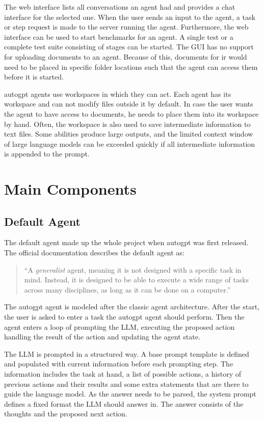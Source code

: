 \documentclass[../main.tex]{subfiles}
\begin{document}
The web interface lists all conversations an agent had and provides a chat interface for the selected one.
When the user sends an input to the agent, a task or step request is made to the server running the agent.
Furthermore, the web interface can be used to start benchmarks for an agent.
A single test or a complete test suite consisting of stages can be started.
The GUI has no support for uploading documents to an agent.
Because of this, documents for \gls{ir} would need to be placed in specific folder locations
such that the agent can access them before it is started.

\gls{autogpt} agents use workspaces in which they can act.
Each agent has its workspace and can not modify files outside it by default.
In case the user wants the agent to have access to documents, he needs to place them into its workspace by hand.
Often, the workspace is also used to save intermediate information to text files.
Some abilities produce large outputs,
and the limited context window of large language models can be exceeded quickly
if all intermediate information is appended to the prompt.

\section{Main Components}
\label{sec:default_agent}

\subsection{Default Agent}

The default agent made up the whole project when \gls{autogpt} was first released.
The official documentation \autocite{zotero-189} describes the default agent as:
\begin{quote}
      ``A \emph{generalist} agent, meaning it is not designed with a specific task in mind.
      Instead, it is designed to be able to execute a wide range of tasks across many disciplines,
      as long as it can be done on a computer.''
\end{quote}

The \gls{autogpt} agent is modeled after the classic agent architecture.
After the start,
the user is asked to enter a task the \gls{autogpt} agent should perform.
Then the agent enters a loop of prompting the LLM,
executing the proposed action
handling the result of the action and updating the agent state.

The LLM is prompted in a structured way.
A base prompt template is defined
and populated with current information before each prompting step.
The information includes the task at hand,
a list of possible actions,
a history of previous actions and their results
and some extra statements that are there to guide the language model.
As the answer needs to be parsed,
the system prompt defines a fixed format the LLM should answer in.
The answer consists of the thoughts and the proposed next action.
\end{document}
